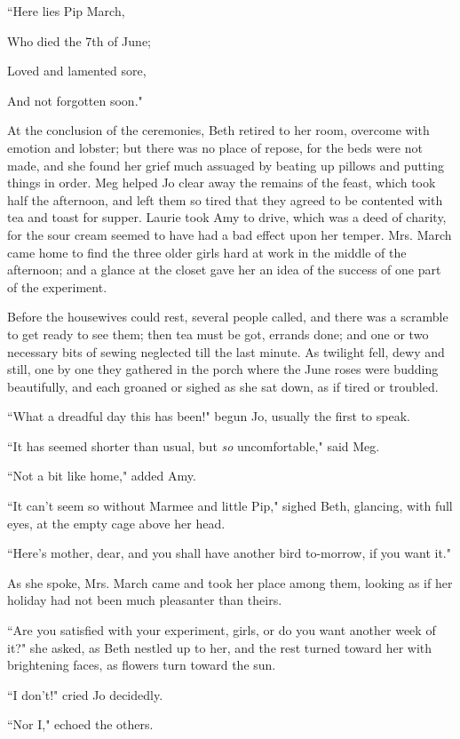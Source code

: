 ``Here lies Pip March,

Who died the 7th of June;

Loved and lamented sore,

And not forgotten soon."

At the conclusion of the ceremonies, Beth retired to her room, overcome
with emotion and lobster; but there was no place of repose, for the beds
were not made, and she found her grief much assuaged by beating up
pillows and putting things in order. Meg helped Jo clear away the
remains of the feast, which took half the afternoon, and left them so
tired that they agreed to be contented with tea and toast for supper.
Laurie took Amy to drive, which was a deed of charity, for the sour
cream seemed to have had a bad effect upon her temper. Mrs. March came
home to find the three older girls hard at work in the middle of the
afternoon; and a glance at the closet gave her an idea of the success of
one part of the experiment.

Before the housewives could rest, several people called, and there was a
scramble to get ready to see them; then tea must be got, errands done;
and one or two necessary bits of sewing neglected till the last minute.
As twilight fell, dewy and still, one by one they gathered in the porch
where the June roses were budding beautifully, and each groaned or
sighed as she sat down, as if tired or troubled.

``What a dreadful day this has been!" begun Jo, usually the first to
speak.

``It has seemed shorter than usual, but \emph{so} uncomfortable," said
Meg.

``Not a bit like home," added Amy.

``It can't seem so without Marmee and little Pip," sighed
Beth, glancing, with full eyes, at the empty cage above her head.

``Here's mother, dear, and you shall have another bird
to-morrow, if you want it."

As she spoke, Mrs. March came and took her place among them, looking as
if her holiday had not been much pleasanter than theirs.

``Are you satisfied with your experiment, girls, or do you want another
week of it?" she asked, as Beth nestled up to her, and the rest turned
toward her with brightening faces, as flowers turn toward the sun.

``I don't!" cried Jo decidedly.

``Nor I," echoed the others.

